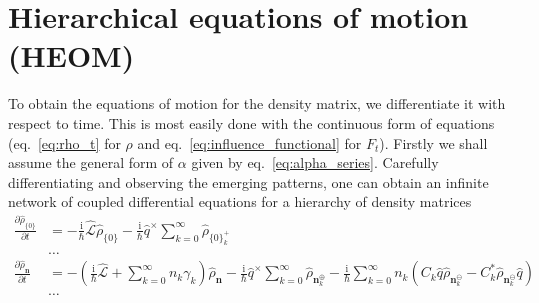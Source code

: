 \section{Hierarchical equations of motion (HEOM)}\label{sec:heom}
To obtain the equations of motion for the density matrix, we differentiate it with respect to time. This is most easily done with the continuous form of equations (eq.~\ref{eq:rho_t} for $\rho$ and eq.~\ref{eq:influence_functional} for $F_t$). Firstly we shall assume the general form of $\alpha$ given by eq.~\ref{eq:alpha_series}. Carefully differentiating and observing the emerging patterns, one can obtain an infinite network of coupled differential equations for a hierarchy of density matrices\supercite{Ishizaki2005,Xu2007a}
\begin{equation}
	\begin{split}
	\frac{\partial     \hat{\rho}_{\{0\}}    }{\partial t} &=
	-\frac{\mathrm{i}}{\hbar}\hat{\mathcal{L}}\hat{\rho}_{\{0\}}
	-\frac{\mathrm{i}}{\hbar}\hat{q}^\times \sum_{k=0}^{\infty}\hat{\rho}_{\{0\}_k^+}\\
	&\dots\\
	\frac{\partial \hat{\rho}_{\bm{n}} }{\partial t} &=
	-\left(\frac{\mathrm{i}}{\hbar}\hat{\mathcal{L}}+\sum_{k=0}^{\infty}n_k \gamma_k \right)\hat{\rho}_{\bm{n}}
	-\frac{\mathrm{i}}{\hbar}\hat{q}^\times \sum_{k=0}^{\infty}\hat{\rho}_{\bm{n}_k^\oplus}
	-\frac{\mathrm{i}}{\hbar}\sum_{k=0}^{\infty}n_k\left(C_k\hat{q}\hat{\rho}_{\bm{n}_k^\ominus}-C_k^*\hat{\rho}_{\bm{n}_k^\ominus}\hat{q}\right)\\
	&\dots\\
	\end{split}
	\label{eq:eom}
\end{equation}

